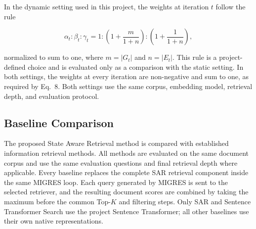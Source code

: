 \documentclass[12pt,a4paper]{report}
\begin{document}
In the dynamic setting used in this project, the weights at iteration $t$ follow the rule

\[
\alpha_t:\beta_t:\gamma_t
=
1:\left(1+\frac{m}{1+n}\right):\left(1+\frac{1}{1+n}\right),
\]

normalized to sum to one, where $m=|G_t|$ and $n=|E_t|$. This rule is a project-defined choice and is evaluated only as a comparison with the static setting. In both settings, the weights at every iteration are non-negative and sum to one, as required by Eq.~8. Both settings use the same corpus, embedding model, retrieval depth, and evaluation protocol.

\subsection{Baseline Comparison}

The proposed State Aware Retrieval method is compared with established
information retrieval methods. All methods are evaluated on the same
document corpus and use the same evaluation questions and final
retrieval depth where applicable. Every baseline replaces the complete SAR retrieval component inside the same MIGRES loop. Each query generated by MIGRES is sent to the selected retriever, and the resulting document scores are combined by taking the maximum before the common Top-$K$ and filtering steps. Only SAR and Sentence Transformer Search use the project Sentence Transformer; all other baselines use their own native representations.
\end{document}
